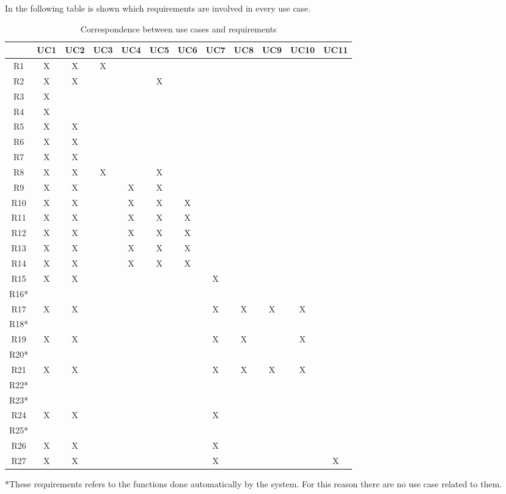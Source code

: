 \documentclass[a4paper]{report}
\begin{document}
In the following table is shown which requirements are involved in every use case.
\begin{table}[H]
  \centering
  \begin{tabular}{|c|c|c|c|c|c|c|c|c|c|c|c|}
    \cline{2-12}
    \multicolumn{1}{c|}{} & UC1 & UC2 & UC3 & UC4 & UC5 & UC6 & UC7 & UC8 & UC9 & UC10 & UC11 \\ \hline
    R1 & X &

    X & X &  &  &  &  &  &  &  &  \\ \hline
    R2 & X & X &  &  & X &  &  &  &  &  &  \\ \hline
    R3 & X &  &  &  &  &  &  &  &  &  &  \\ \hline
    R4 & X &  &  &  &  &  &  &  &  &  &  \\ \hline
    R5 & X & X &  &  &  &  &  &  &  &  &  \\ \hline
    R6 & X & X &  &  &  &  &  &  &  &  &  \\ \hline
    R7 & X & X &  &  &  &  &  &  &  &  &  \\ \hline
    R8 & X & X & X &  & X &  &  &  &  &  &  \\ \hline
    R9 & X & X &  & X & X &  &  &  &  &  &  \\ \hline
    R10 & X & X &  & X & X & X &  &  &  &  &  \\ \hline
    R11 & X & X &  & X & X & X &  &  &  &  &  \\ \hline
    R12 & X & X &  & X & X & X &  &  &  &  &  \\ \hline
    R13 & X & X &  & X & X & X &  &  &  &  &  \\ \hline
    R14 & X & X &  & X & X & X &  &  &  &  &  \\ \hline
    R15 & X & X &  &  &  &  & X &  &  &  &  \\ \hline
    R16* &  &  &  &  &  &  &  &  &  &  &  \\ \hline
    R17 & X & X &  &  &  &  & X & X & X & X &  \\ \hline
    R18* &  &  &  &  &  &  &  &  &  &  &  \\ \hline
    R19 & X & X &  &  &  &  & X & X &   & X &  \\ \hline
    R20* &  &  &  &  &  &  &  &  &  &  &  \\ \hline
    R21 & X & X &  &  &  &  & X & X & X & X &  \\ \hline
    R22* &  &  &  &  &  &  &  &  &  &  &  \\ \hline
    R23* &  &  &  &  &  &  &  &  &  &  &  \\ \hline
    R24 & X & X &  &  &  &  & X &  &  &  &  \\ \hline
    R25* &  &  &  &  &  &  &  &  &  &  &  \\ \hline
    R26 & X & X &  &  &  &  & X &  &  &  &  \\ \hline
    R27 & X & X &  &  &  &  & X &  &  &  &  X\\ \hline
  \end{tabular}
  \caption{Correspondence between use cases and requirements}
\end{table}
*These requirements refers to the functions done automatically by the system. For this reason there are no use case related to them.
\end{document}
